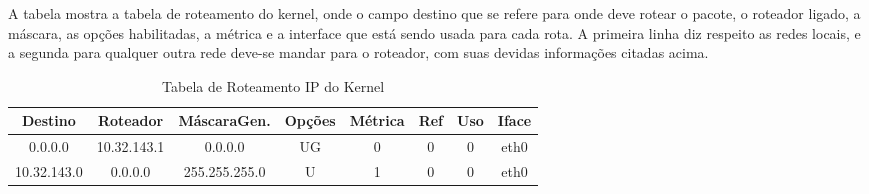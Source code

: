 \documentclass[12pt]{article}
\begin{document}
     A tabela mostra a tabela de roteamento do kernel, onde o campo destino que se refere para onde deve rotear o pacote, o roteador ligado, a máscara, as opções habilitadas, a métrica e a interface que está sendo usada para cada rota. A primeira linha diz respeito as redes locais, e a segunda para qualquer outra rede deve-se mandar para o roteador, com suas devidas informações citadas acima. 
    
    \begin{table}[ht]
    \centering
    \caption{Tabela de Roteamento IP do Kernel}
    \vspace{0.5cm}
    \begin{tabular}{c|c|c|c|c|c|c|c}
    \hline   
    \hline   
    Destino & Roteador & MáscaraGen. & Opções & Métrica & Ref & Uso & Iface \\
    \hline   
    0.0.0.0 & 10.32.143.1 & 0.0.0.0 & UG & 0 & 0 & 0 &eth0 \\
    10.32.143.0 & 0.0.0.0 & 255.255.255.0 & U & 1 & 0 & 0& eth0 \\
    \hline   
    \hline   
    \end{tabular}
    \end{table}
\end{document}
